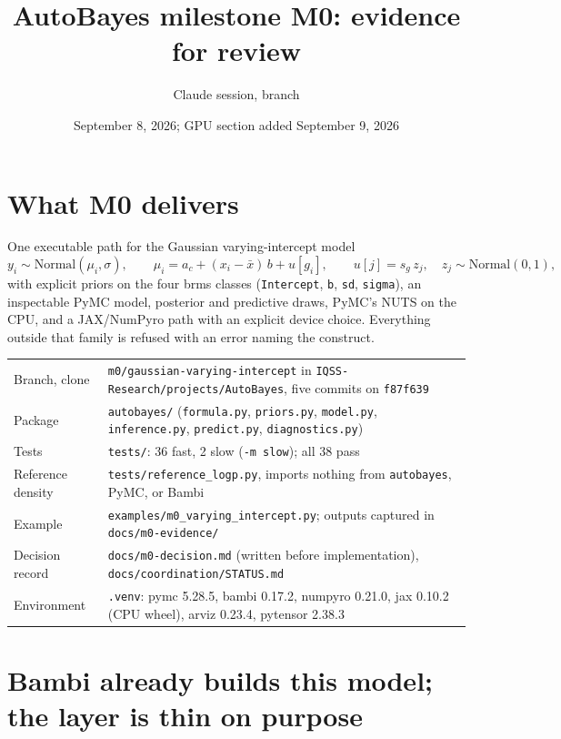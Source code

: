 \documentclass[11pt]{article}
\title{AutoBayes milestone M0: evidence for review}
\author{Claude session, branch \code{m0/gaussian-varying-intercept}}
\date{September 8, 2026; GPU section added September 9, 2026}
\newcommand{\code}[1]{\texttt{#1}}
\newcommand{\file}[1]{\texttt{#1}}
\begin{document}
\maketitle

\section{What M0 delivers}

One executable path for the Gaussian varying-intercept model
\[
y_i \sim \mathrm{Normal}(\mu_i,\sigma), \qquad
\mu_i = a_c + (x_i - \bar x)\,b + u[g_i], \qquad u[j] = s_g\, z_j,\quad z_j \sim \mathrm{Normal}(0,1),
\]
with explicit priors on the four brms classes (\code{Intercept}, \code{b}, \code{sd}, \code{sigma}),
an inspectable PyMC model, posterior and predictive draws, PyMC's NUTS on the CPU, and a
JAX/NumPyro path with an explicit device choice. Everything outside that family is
refused with an error naming the construct.

\begin{center}\footnotesize
\begin{tabular}{p{}p{}}
\toprule
Branch, clone & \code{m0/gaussian-varying-intercept} in \file{IQSS-Research/projects/AutoBayes}, five commits on \code{f87f639} \\
Package & \file{autobayes/} (\file{formula.py}, \file{priors.py}, \file{model.py}, \file{inference.py}, \file{predict.py}, \file{diagnostics.py}) \\
Tests & \file{tests/}: 36 fast, 2 slow (\code{-m slow}); all 38 pass \\
Reference density & \file{tests/reference\_logp.py}, imports nothing from \code{autobayes}, PyMC, or Bambi \\
Example & \file{examples/m0\_varying\_intercept.py}; outputs captured in \file{docs/m0-evidence/} \\
Decision record & \file{docs/m0-decision.md} (written before implementation), \file{docs/coordination/STATUS.md} \\
Environment & \file{.venv}: pymc 5.28.5, bambi 0.17.2, numpyro 0.21.0, jax 0.10.2 (CPU wheel), arviz 0.23.4, pytensor 2.38.3 \\
\bottomrule
\end{tabular}
\end{center}

\section{Bambi already builds this model; the layer is thin on purpose}
\end{document}
